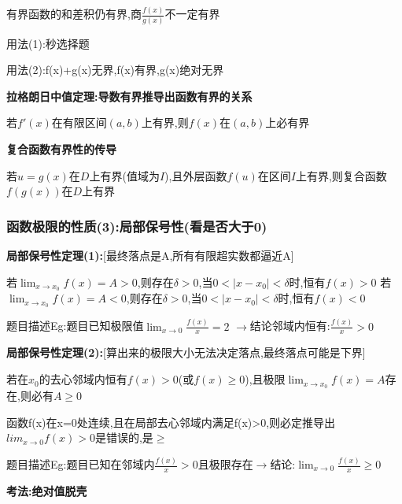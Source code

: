 \documentclass[11pt,a4paper,UTF8]{ctexart}
\begin{document}
\begin{solbox}[{分步推导与答题规范}]
\textit{}有界函数的和差积仍有界,商$\frac{f(x)}{g(x)}$不一定有界\textit{}

用法(1):秒选择题

用法(2):f(x)+g(x)无界,f(x)有界,g(x)绝对无界

\textbf{拉格朗日中值定理:导数有界推导出函数有界的关系}

若$f'(x)$在有限区间$(a,b)$上有界,则$f(x)$在$(a,b)$上必有界

\textbf{复合函数有界性的传导}

若$u = g(x)$在$D$上有界(值域为$I$),且外层函数$f(u)$在区间$I$上有界,则复合函数$f(g(x))$在$D$上有界
\end{solbox}


\subsubsection{函数极限的性质(3):局部保号性(看是否大于0)}

\textbf{局部保号性定理(1):}[最终落点是A,所有有限超实数都逼近A]

\begin{solbox}[{分步推导与答题规范}]
  \textit{}若$\lim_{x \to x_0} f(x) = A > 0$,则存在$\delta > 0$,当$0 < \vert{}x - x_0\vert{} < \delta$时,恒有$f(x) > 0$
  若$\lim_{x \to x_0} f(x) = A < 0$,则存在$\delta > 0$,当$0 < \vert{}x - x_0\vert{} < \delta$时,恒有$f(x) < 0$\textit{}

  题目描述Eg:题目已知极限值$\lim_{x \to 0} \frac{f(x)}{x} = 2$ $\rightarrow$结论邻域内恒有:$\frac{f(x)}{x} > 0$
\end{solbox}

\textbf{局部保号性定理(2):}[算出来的极限大小无法决定落点,最终落点可能是下界]

\begin{solbox}[{分步推导与答题规范}]
  \textit{}若在$x_0$的去心邻域内恒有$f(x) > 0$(或$f(x) \ge 0$),且极限$\lim_{x \to x_0} f(x) = A$存在,则必有$A \ge 0$\textit{}

  函数f(x)在x=0处连续,且在局部去心邻域内满足f(x)>0,则必定推导出$lim_{x\rightarrow 0}f(x)>0$是错误的,是$\geq$

  题目描述Eg:题目已知在邻域内$\frac{f(x)}{x} > 0$且极限存在$\rightarrow$结论:$\lim_{x \to 0} \frac{f(x)}{x} \ge 0$
\end{solbox}

\textbf{考法:绝对值脱壳}
\end{document}

